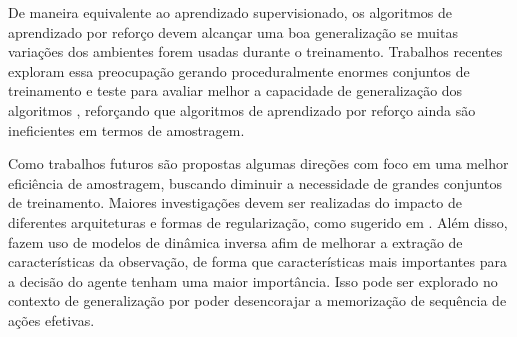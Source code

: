 De maneira equivalente ao aprendizado supervisionado, os algoritmos de aprendizado por reforço devem alcançar uma boa generalização se muitas variações dos ambientes forem usadas durante o treinamento. Trabalhos recentes exploram essa preocupação gerando proceduralmente enormes conjuntos de treinamento e teste para avaliar melhor a capacidade de generalização dos algoritmos \cite{cobbe2019, cobe18}, reforçando que algoritmos de aprendizado por reforço ainda são ineficientes em termos de amostragem.

Como trabalhos futuros são propostas algumas direções com foco em uma melhor eficiência de amostragem, buscando diminuir a necessidade de grandes conjuntos de treinamento. Maiores investigações devem ser realizadas do impacto de diferentes arquiteturas e formas de regularização, como sugerido em \cite{cobe18}. Além disso, \cite{curiositylarge, pathak} fazem uso de modelos de dinâmica inversa afim de melhorar a extração de características da observação, de forma que características mais importantes para a decisão do agente tenham uma maior importância. Isso pode ser explorado no contexto de generalização por poder desencorajar a memorização de sequência de ações efetivas. 









